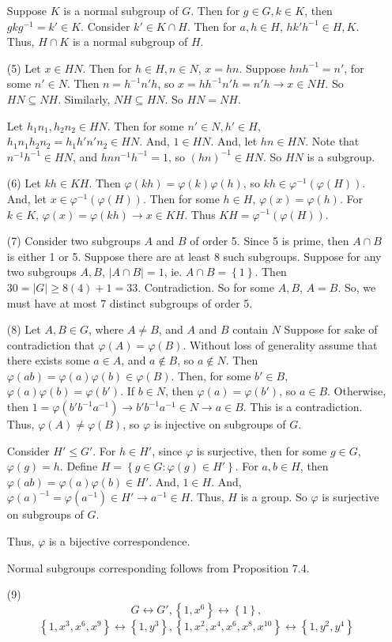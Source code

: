 \begin{itemize}
Suppose $K$ is a normal subgroup of $G$. Then for $g \in G, k \in K$, then $gkg^{-1} = k' \in K$. Consider $k' \in K \cap H$. Then for $a, h \in H$, $hk'h^{-1} \in H, K$. Thus, $H \cap K$ is a normal subgroup of $H$.
\item[(5)]
Let $x \in HN$. Then for $h \in H, n \in N$, $x = hn$. Suppose $hnh^{-1} = n'$, for some $n' \in N$. Then $n = h^{-1}n'h$, so $x = hh^{-1}n'h = n'h \rightarrow x \in NH$. So $HN \subseteq NH$. Similarly, $NH \subseteq HN$. So $HN = NH$. 

Let $h_1n_1, h_2n_2 \in HN$. Then for some $n' \in N, h' \in H$, $h_1n_1h_2n_2 = h_1h'n'n_2 \in HN$. And, $1 \in HN$. And, let $hn \in HN$. Note that $n^{-1}h^{-1} \in HN$, and $hnn^{-1}h^{-1} = 1$, so $(hn)^{-1} \in HN$. So $HN$ is a subgroup.
\item[(6)]
Let $kh \in KH$. Then $\varphi(kh) = \varphi(k)\varphi(h)$, so $kh \in \varphi^{-1}(\varphi(H))$. And, let $x \in \varphi^{-1}(\varphi(H))$. Then for some $h \in H$, $\varphi(x) = \varphi(h)$. For $k \in K$, $\varphi(x) = \varphi(kh) \rightarrow x \in KH$. Thus $KH = \varphi^{-1}(\varphi(H))$.
\item[(7)]
Consider two subgroups $A$ and $B$ of order 5. Since 5 is prime, then $A \cap B$ is either 1 or 5. Suppose there are at least 8 such subgroups. Suppose for any two subgroups $A, B$, $|A \cap B| = 1$, ie. $A \cap B = \left\lbrace 1 \right\rbrace$. Then $30 = |G| \geq 8(4) + 1 = 33$. Contradiction. So for some $A, B$, $A = B$. So, we must have at most 7 distinct subgroups of order 5.
\item[(8)]
Let $A, B \in G$, where $A \neq B$, and $A$ and $B$ contain $N$ Suppose for sake of contradiction that $\varphi(A) = \varphi(B)$. Without loss of generality assume that there exists some $a \in A$, and $a \not \in B$, so $a \not \in N$. Then $\varphi(ab) = \varphi(a)\varphi(b) \in \varphi(B)$. Then, for some $b' \in B$, $\varphi(a)\varphi(b) = \varphi(b')$. If $b \in N$, then $\varphi(a) = \varphi(b')$, so $a \in B$. Otherwise, then $1 = \varphi(b'b^{-1}a^{-1}) \rightarrow b'b^{-1}a^{-1} \in N \rightarrow a \in B$. This is a contradiction. Thus, $\varphi(A) \neq \varphi(B)$, so $\varphi$ is injective on subgroups of $G$. 

Consider $H' \leq G'$. For $h \in H'$, since $\varphi$ is surjective, then for some $g \in G$, $\varphi(g) = h$. Define $H = \left\lbrace g \in G : \varphi(g) \in H' \right\rbrace$. For $a, b \in H$, then $\varphi(ab) = \varphi(a)\varphi(b) \in H'$. And, $1 \in H$. And, $\varphi(a)^{-1} = \varphi(a^{-1}) \in H' \rightarrow a^{-1} \in H$. Thus, $H$ is a group. So $\varphi$ is surjective on subgroups of $G$.

Thus, $\varphi$ is a bijective correspondence.

Normal subgroups corresponding follows from Proposition 7.4.
\item[(9)]
$$G \leftrightarrow G', \left\lbrace 1, x^6 \right\rbrace \leftrightarrow \left\lbrace 1 \right\rbrace,$$
$$\left\lbrace 1, x^3, x^6, x^9 \right\rbrace \leftrightarrow \left\lbrace 1, y^3 \right\rbrace, \left\lbrace 1, x^2, x^4, x^6, x^8, x^{10} \right\rbrace \leftrightarrow \left\lbrace 1, y^2, y^4 \right\rbrace$$
\end{itemize}
%